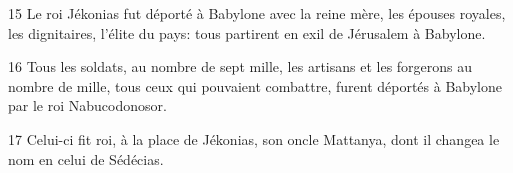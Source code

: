 
15 Le roi Jékonias fut déporté à Babylone avec la reine mère, les épouses royales, les dignitaires, l’élite du pays: tous partirent en exil de Jérusalem à Babylone.

16 Tous les soldats, au nombre de sept mille, les artisans et les forgerons au nombre de mille, tous ceux qui pouvaient combattre, furent déportés à Babylone par le roi Nabucodonosor.

17 Celui-ci fit roi, à la place de Jékonias, son oncle Mattanya, dont il changea le nom en celui de Sédécias.